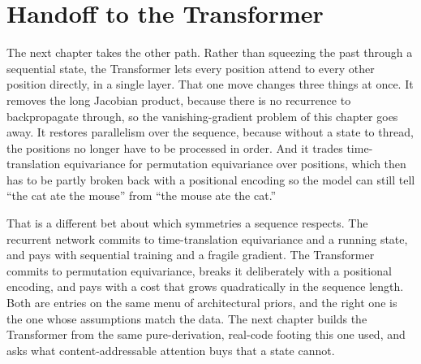 \section{Handoff to the Transformer}\label{sec:rnn-handoff}

The next chapter takes the other path. Rather than squeezing the past
through a sequential state, the Transformer lets every position attend to
every other position directly, in a single layer. That one move changes
three things at once. It removes the long Jacobian product, because there is
no recurrence to backpropagate through, so the vanishing-gradient problem of
this chapter goes away. It restores parallelism over the sequence, because
without a state to thread, the positions no longer have to be processed in
order. And it trades time-translation equivariance for permutation
equivariance over positions, which then has to be partly broken back with a
positional encoding so the model can still tell ``the cat ate the mouse''
from ``the mouse ate the cat.''

That is a different bet about which symmetries a sequence respects. The
recurrent network commits to time-translation equivariance and a running
state, and pays with sequential training and a fragile gradient. The
Transformer commits to permutation equivariance, breaks it deliberately with
a positional encoding, and pays with a cost that grows quadratically in the
sequence length. Both are entries on the same menu of architectural priors,
and the right one is the one whose assumptions match the data. The next
chapter builds the Transformer from the same pure-derivation, real-code
footing this one used, and asks what content-addressable attention buys that
a state cannot.
